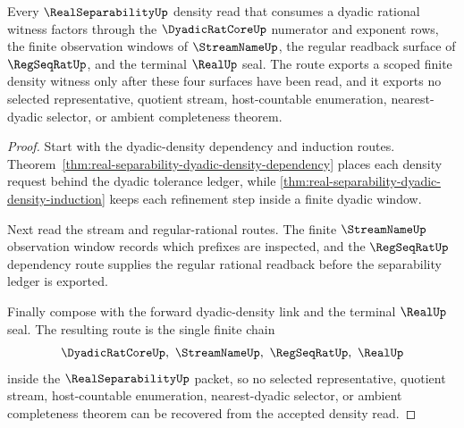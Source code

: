 \begin{theorem}
\label{thm:real-separability-dyadic-density-scope}
Every $\RealSeparabilityUp$ density read that consumes a dyadic rational witness factors through the $\DyadicRatCoreUp$ numerator and exponent rows, the finite observation windows of $\StreamNameUp$, the regular readback surface of $\RegSeqRatUp$, and the terminal $\RealUp$ seal. The route exports a scoped finite density witness only after these four surfaces have been read, and it exports no selected representative, quotient stream, host-countable enumeration, nearest-dyadic selector, or ambient completeness theorem.
\end{theorem}
\begin{proof}
Start with the dyadic-density dependency and induction routes. Theorem~\ref{thm:real-separability-dyadic-density-dependency} places each density request behind the dyadic tolerance ledger, while \autoref{thm:real-separability-dyadic-density-induction} keeps each refinement step inside a finite dyadic window.

Next read the stream and regular-rational routes. The finite $\StreamNameUp$ observation window records which prefixes are inspected, and the $\RegSeqRatUp$ dependency route supplies the regular rational readback before the separability ledger is exported.

Finally compose with the forward dyadic-density link and the terminal $\RealUp$ seal. The resulting route is the single finite chain
$$
\DyadicRatCoreUp,\ \StreamNameUp,\ \RegSeqRatUp,\ \RealUp
$$
inside the $\RealSeparabilityUp$ packet, so no selected representative, quotient stream, host-countable enumeration, nearest-dyadic selector, or ambient completeness theorem can be recovered from the accepted density read.
\end{proof}
